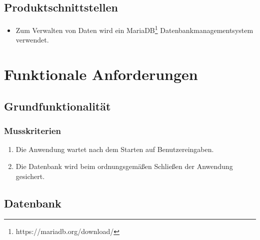 \documentclass[13pt]{scrreprt}
\newcounter{tempcounter1}
\newcounter{tempcounter2}
\newcounter{tempcounter3}
\newcounter{tempcounter4}
\newcounter{tempcounter5}
\newcounter{tempcounter6}
\newcounter{tempcounter7}
\newcounter{tempcounter8}
\newcounter{tempcounter9}
\begin{document}
\section{Produktschnittstellen}
\begin{itemize}
\item{Zum Verwalten von Daten wird ein MariaDB\footnote{https://mariadb.org/download/} Datenbankmanagementsystem verwendet.}
\end{itemize}

\chapter{Funktionale Anforderungen}

\section{Grundfunktionalität}
\subsection{Musskriterien}
\begin{addmargin}[25pt]{0pt}
\begin{enumerate} [label=FA\arabic*,start=100]
	\item \label{FA100}Die Anwendung wartet nach dem Starten auf Benutzereingaben.
	\item \label{FA101}Die Datenbank wird beim ordnungsgemäßen Schließen der Anwendung gesichert.
\setcounter{tempcounter3}{\value{enumi}}
\end{enumerate}
\end{addmargin}
\addtocounter{tempcounter3}{1}
\begin{addmargin}[25pt]{0pt}
\begin{enumerate} [label=FA\arabic*,start=\value{tempcounter3}]
\end{enumerate}
\end{addmargin}

\section{Datenbank}
\end{document}
